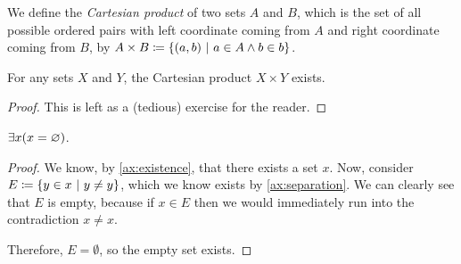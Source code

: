 % 
%         
% 
% 
% 

\begin{definition}
    We define the \emph{Cartesian product} of two sets \(A\) and \(B\),
    which is the set of all possible ordered pairs with
    left coordinate coming from \(A\) and right coordinate coming from \(B\),
    by \(A \times B \defn \set*{(a, b) \suchthat a \in A \meet b \in b}\).
\end{definition}

\begin{theorem}
    For any sets \(X\) and \(Y\), the Cartesian product \(X \times Y\) exists.
\end{theorem}
\begin{proof}
    This is left as a (tedious) exercise for the reader.
\end{proof}

\newpage

\begin{theorem}
    \(\exists x \pn*{x = \emptyset}\).
\end{theorem}
\begin{proof}
    We know, by \autoref{ax:existence}, that there exists a set \(x\).
    Now, consider \(E \defn \set*{y \in x \suchthat  y \neq y}\),
    which we know exists by \autoref{ax:separation}.
    We can clearly see that \(E\) is empty,
    because if \(x \in E\) then we would immediately run into the contradiction \(x \neq x\).

    Therefore, \(E = \emptyset\), so the empty set exists.
\end{proof}

